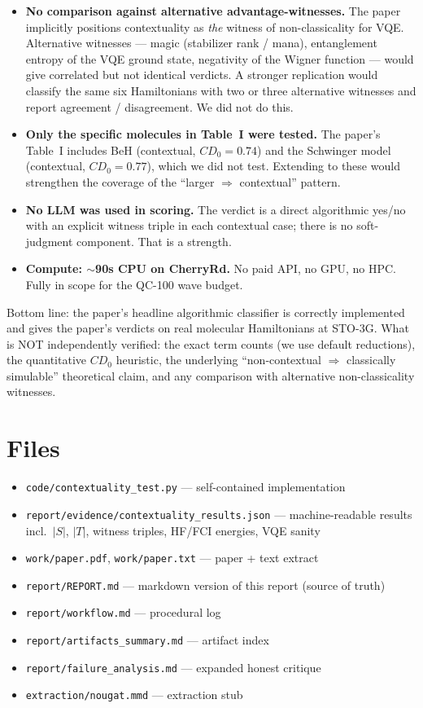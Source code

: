 \documentclass[11pt]{article}
\begin{document}
\begin{itemize}
\item \textbf{No comparison against alternative advantage-witnesses.} The
  paper implicitly positions contextuality as \emph{the} witness of
  non-classicality for VQE. Alternative witnesses --- magic (stabilizer
  rank / mana), entanglement entropy of the VQE ground state, negativity
  of the Wigner function --- would give correlated but not identical
  verdicts. A stronger replication would classify the same six
  Hamiltonians with two or three alternative witnesses and report agreement
  / disagreement. We did not do this.

\item \textbf{Only the specific molecules in Table~I were tested.} The
  paper's Table~I includes BeH (contextual, $CD_0{=}0.74$) and the Schwinger
  model (contextual, $CD_0{=}0.77$), which we did not test. Extending to
  these would strengthen the coverage of the ``larger $\Rightarrow$
  contextual'' pattern.

\item \textbf{No LLM was used in scoring.} The verdict is a direct
  algorithmic yes/no with an explicit witness triple in each contextual
  case; there is no soft-judgment component. That is a strength.

\item \textbf{Compute: $\sim$90s CPU on CherryRd.} No paid API, no GPU,
  no HPC. Fully in scope for the QC-100 wave budget.
\end{itemize}

Bottom line: the paper's headline algorithmic classifier is
correctly implemented and gives the paper's verdicts on real molecular
Hamiltonians at STO-3G. What is NOT independently verified: the exact term
counts (we use default reductions), the quantitative $CD_0$ heuristic,
the underlying ``non-contextual $\Rightarrow$ classically simulable''
theoretical claim, and any comparison with alternative non-classicality
witnesses.

\section{Files}

\begin{itemize}
\item \texttt{code/contextuality\_test.py} --- self-contained implementation
\item \texttt{report/evidence/contextuality\_results.json} --- machine-readable
  results incl.\ $|S|$, $|T|$, witness triples, HF/FCI energies, VQE sanity
\item \texttt{work/paper.pdf}, \texttt{work/paper.txt} --- paper + text extract
\item \texttt{report/REPORT.md} --- markdown version of this report (source of truth)
\item \texttt{report/workflow.md} --- procedural log
\item \texttt{report/artifacts\_summary.md} --- artifact index
\item \texttt{report/failure\_analysis.md} --- expanded honest critique
\item \texttt{extraction/nougat.mmd} --- extraction stub
\end{itemize}
\end{document}
